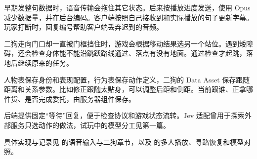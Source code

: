 \documentclass[11pt]{article}
\begin{document}
早期发整句数据时，语音传输会拖住其它状态。后来按播放进度发送，使用 Opus 减少数据量，并在后台编码。客户端按照自己接收到和实际播放的句子更新字幕。玩家打断时，回复编号帮助客户端丢弃迟到的音频。

二狗走向门口却一直被门框挡住时，游戏会根据移动结果选另一个站位。遇到矮障碍，还会检查身体能不能沿跳跃路线通过、落点有没有地面。通过检查才起跳，落地后继续原来的任务。

人物表保存身份和表现配置，行为表保存动作定义，二狗的 Data Asset 保存跟随距离和关系参数。比如修正跟随太贴身，可以调整后距和侧距。当前跟谁、正拿哪件货、是否完成委托，由服务器组件保存。

后端提供固定“等待”回复，便于检查协议和游戏状态流转。Jev 适配曾用于探索外部服务只选动作的做法，试玩中的模型分工见第一篇。

{\small 具体实现与记录见  的语音输入与二狗章节，以及  的多人播放、寻路恢复和模型对照。}
\end{document}
